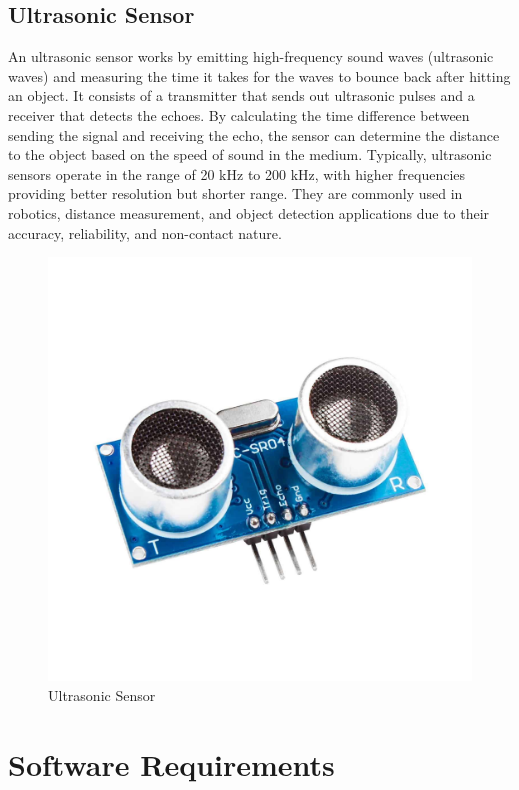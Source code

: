 \subsection{Ultrasonic Sensor}
An ultrasonic sensor works by emitting high-frequency sound waves (ultrasonic waves) and measuring the time it takes for the waves to bounce back after hitting an object. It consists of a transmitter that sends out ultrasonic pulses and a receiver that detects the echoes. By calculating the time difference between sending the signal and receiving the echo, the sensor can determine the distance to the object based on the speed of sound in the medium. Typically, ultrasonic sensors operate in the range of 20 kHz to 200 kHz, with higher frequencies providing better resolution but shorter range. They are commonly used in robotics, distance measurement, and object detection applications due to their accuracy, reliability, and non-contact nature.
\begin{figure}[h]
    \centering
    \includegraphics[width=1\linewidth]{Graphics/ultrasonicSensorImg.jpg}
    \caption{Ultrasonic Sensor}
    \label{fig:enter-label}
\end{figure}

  \section{Software Requirements}
